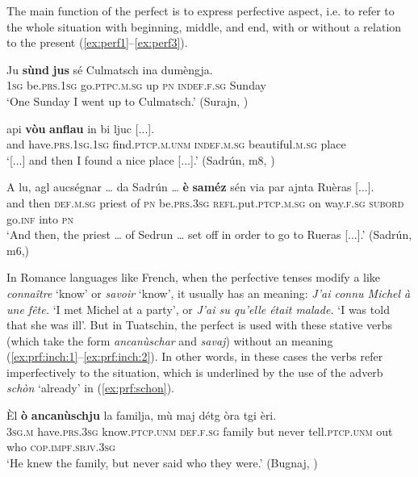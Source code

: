 The main function of the perfect is to express perfective aspect, i.e. to refer to the whole situation with beginning, middle, and end, with or without a relation to the present (\ref{ex:perf1}--\ref{ex:perf3}).

\ea\label{ex:perf1}
\gll    Ju \textbf{sùnd} \textbf{jus} sé Culmatsch ina dumèngja. \\
\textsc{1sg} be.\textsc{prs.1sg} go.\textsc{ptpc.m.sg} up \textsc{pn} \textsc{indef.f.sg} Sunday\\
\glt `One Sunday I went up to Culmatsch.' (Surajn, \citealt[128]{Büchli1966})
\z

\ea
\label{ex:perf2}
\gll  [...] api \textbf{vòu} \textbf{anflau} in bi ljuc [...].\\
 {} and have.\textsc{prs.1sg.1sg} find.\textsc{ptcp.m.unm} \textsc{indef.m.sg} beautiful.\textsc{m.sg} place\\
\glt `[...] and then I found a nice place [...].' (Sadrún, m8, )
\z

\ea\label{ex:perf3}
\gll    A lu, agl aucségnar … da Sadrún … \textbf{è} \textbf{saméz} sén via par  ajnta Ruèras [...].\\
and then \textsc{def.m.sg} priest {} of \textsc{pn} {} be.\textsc{prs.3sg} \textsc{refl.}put.\textsc{ptcp.m.sg} on way.\textsc{f.sg} \textsc{subord} go.\textsc{inf} into \textsc{pn}\\
\glt `And then, the priest … of Sedrun … set off in order to go to Rueras [...].' (Sadrún, m6,)
\z

In Romance languages like French, when the perfective tenses modify a  like \textit{connaître} `know' or \textit{savoir} `know', it usually has an  meaning: \textit{J'ai connu Michel à une fête.} `I met Michel at a party', or \textit{J'ai su qu'elle était malade.} `I was told that she was ill'. But in Tuatschin, the perfect is used with these stative verbs (which take the form \textit{ancanùschar} and \textit{savaj}) without an  meaning (\ref{ex:prf:inch:1}--\ref{ex:prf:inch:2}). In other words, in these cases the verbs refer imperfectively to the situation, which is underlined by the use of the adverb \textit{schòn} `already' in (\ref{ex:prf:schon}).

\ea\label{ex:prf:inch:1}
\gll    Èl \textbf{ò} \textbf{ancanùschju} la familja, mù maj détg òra tgi èri. \\
     \textsc{3sg.m} have.\textsc{prs.3sg} know.\textsc{ptcp.unm} \textsc{def.f.sg} family but never tell.\textsc{ptcp.unm} out who \textsc{cop.impf.sbjv.3sg}\\
\glt `He knew the family, but never said who they were.' (Bugnaj, \citealt[139]{Büchli1966})
\z

